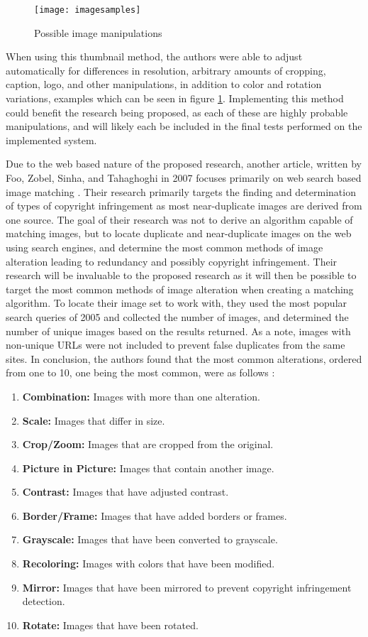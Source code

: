 \documentclass[11pt]{article}
\begin{document}
\begin{figure}[htbp]
\centering
\texttt{[image: imagesamples]}
\caption{Possible image manipulations}
\label{imgsample}
\end{figure}

When using this thumbnail method, the authors were able to adjust automatically for differences in resolution, arbitrary amounts of cropping, caption, logo, and other manipulations, in addition to color and rotation variations, examples which can be seen in figure \ref{imgsample}. Implementing this method could benefit the research being proposed, as each of these are highly probable manipulations, and will likely each be included in the final tests performed on the implemented system.

Due to the web based nature of the proposed research, another article, written by Foo, Zobel, Sinha, and Tahaghoghi in 2007 focuses primarily on web search based image matching \cite{Foo:2007}. Their research primarily targets the finding and determination of types of copyright infringement as most near-duplicate images are derived from one source. The goal of their research was not to derive an algorithm capable of matching images, but to locate duplicate and near-duplicate images on the web using search engines, and determine the most common methods of image alteration leading to redundancy and possibly copyright infringement. Their research will be invaluable to the proposed research as it will then be possible to target the most common methods of image alteration when creating a matching algorithm. To locate their image set to work with, they used the most popular search queries of 2005 and collected the number of images, and determined the number of unique images based on the results returned. As a note, images with non-unique URLs were not included to prevent false duplicates from the same sites. In conclusion, the authors found that the most common alterations, ordered from one to 10, one being the most common, were as follows \cite{Foo:2007}:
\begin{enumerate}
\item
\textbf{Combination:} Images with more than one alteration.
\item
\textbf{Scale:} Images that differ in size.
\item
\textbf{Crop/Zoom:} Images that are cropped from the original.
\item
\textbf{Picture in Picture:} Images that contain another image.
\item
\textbf{Contrast:} Images that have adjusted contrast.
\item
\textbf{Border/Frame:} Images that have added borders or frames.
\item
\textbf{Grayscale:} Images that have been converted to grayscale.
\item
\textbf{Recoloring:} Images with colors that have been modified.
\item
\textbf{Mirror:} Images that have been mirrored to prevent copyright infringement detection.
\item
\textbf{Rotate:} Images that have been rotated.
\end{enumerate}
\end{document}
